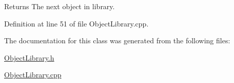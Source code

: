 \begin{DoxyReturn}{Returns}
The next object in library. 
\end{DoxyReturn}


Definition at line 51 of file ObjectLibrary.cpp.



The documentation for this class was generated from the following files:\begin{DoxyCompactItemize}
\item 
\hyperlink{_object_library_8h}{ObjectLibrary.h}\item 
\hyperlink{_object_library_8cpp}{ObjectLibrary.cpp}\end{DoxyCompactItemize}
